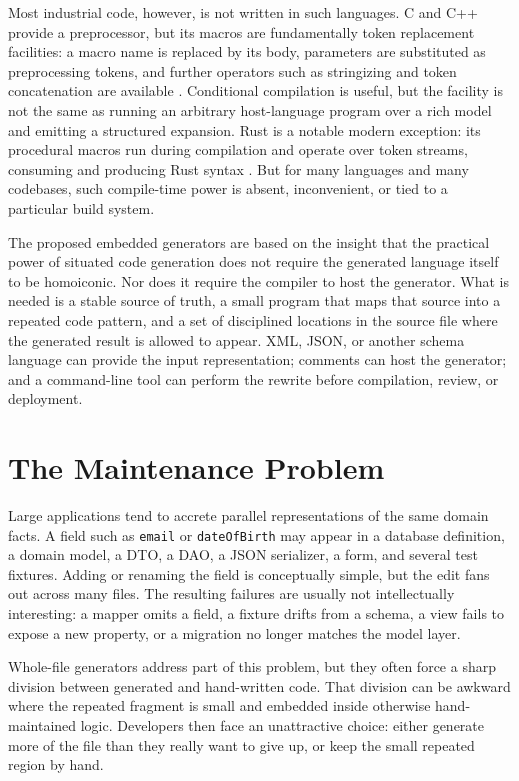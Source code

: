 \documentclass[11pt]{article}
\begin{document}
Most industrial code, however, is not written in such languages.  C and C++
provide a preprocessor, but its macros are fundamentally token replacement
facilities: a macro name is replaced by its body, parameters are substituted as
preprocessing tokens, and further operators such as stringizing and token
concatenation are available \cite{gcc-cpp-macros,gcc-cpp-args}.  Conditional
compilation is useful, but the facility is not the same as running an arbitrary
host-language program over a rich model and emitting a structured expansion.
Rust is a notable modern exception: its procedural macros run during
compilation and operate over token streams, consuming and producing Rust syntax
\cite{rust-proc-macros}.  But for many languages and many codebases, such
compile-time power is absent, inconvenient, or tied to a particular build
system.

The proposed embedded generators are based on the insight that the practical power of
situated code generation does not require the generated language itself to be
homoiconic.  Nor does it require the compiler to host the generator.  What is
needed is a stable source of truth, a small program that maps that source into a
repeated code pattern, and a set of disciplined locations in the source file where the
generated result is allowed to appear.  XML, JSON, or another schema language
can provide the input representation; comments can host the generator; and a
command-line tool can perform the rewrite before compilation, review, or
deployment.

\section{The Maintenance Problem}

Large applications tend to accrete parallel representations of the same domain
facts.  A field such as \texttt{email} or \texttt{dateOfBirth} may appear in a
database definition, a domain model, a DTO, a DAO, a JSON serializer, a form,
and several test fixtures.  Adding or renaming the field is conceptually simple,
but the edit fans out across many files.  The resulting failures are usually
not intellectually interesting: a mapper omits a field, a fixture drifts from a
schema, a view fails to expose a new property, or a migration no longer matches
the model layer.

Whole-file generators address part of this problem, but they often force a
sharp division between generated and hand-written code.  That division can be
awkward where the repeated fragment is small and embedded inside otherwise
hand-maintained logic.  Developers then face an unattractive choice: either
generate more of the file than they really want to give up, or keep the small
repeated region by hand.
\end{document}
